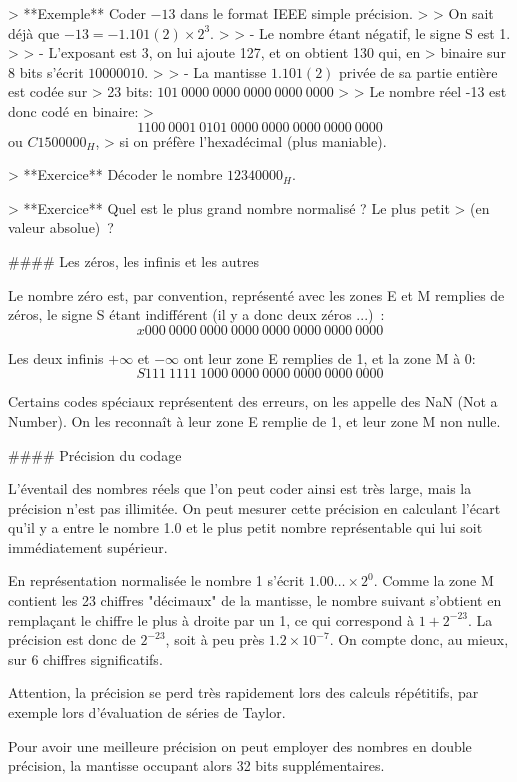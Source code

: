 > **Exemple** Coder $-13$ dans le format IEEE simple précision.
>
> On sait déjà que $-13 = -1.101 (2) \times 2^3$.
>
> -   Le nombre étant négatif, le signe S est 1.
>
> -   L'exposant est 3, on lui ajoute 127, et on obtient 130 qui, en
>     binaire sur 8 bits s'écrit $1000 0010$.
>
> -   La mantisse $1.101 (2)$ privée de sa partie entière est codée sur
>     23 bits: $101\ 0000\ 0000\ 0000\ 0000\ 0000$
>
> Le nombre réel -13 est donc codé en binaire:
> $$1100\ 0001\ 0101\ 0000\ 0000\ 0000\ 0000\ 0000$$ ou $C150 0000_H$,
> si on préfère l'hexadécimal (plus maniable).

> **Exercice** Décoder le nombre $1234 0000_H$.

> **Exercice** Quel est le plus grand nombre normalisé ? Le plus petit
> (en valeur absolue) ?

#### Les zéros, les infinis et les autres

Le nombre zéro est, par convention, représenté avec les zones E et M
remplies de zéros, le signe S étant indifférent (il y a donc deux zéros
...) : $$x000\ 0000\ 0000\ 0000\ 0000\ 0000\ 0000\ 0000$$

Les deux infinis $+\infty$ et $-\infty$ ont leur zone E remplies de 1,
et la zone M à 0: $$S111\ 1111\ 1000\ 0000\ 0000\ 0000\ 0000\ 0000$$

Certains codes spéciaux représentent des erreurs, on les appelle des NaN
(Not a Number). On les reconnaît à leur zone E remplie de 1, et leur
zone M non nulle.

#### Précision du codage

L'éventail des nombres réels que l'on peut coder ainsi est très large,
mais la précision n'est pas illimitée. On peut mesurer cette précision
en calculant l'écart qu'il y a entre le nombre 1.0 et le plus petit
nombre représentable qui lui soit immédiatement supérieur.

En représentation normalisée le nombre 1 s'écrit
$1.00\ldots \times 2^0$. Comme la zone M contient les 23 chiffres
"décimaux" de la mantisse, le nombre suivant s'obtient en remplaçant le
chiffre le plus à droite par un 1, ce qui correspond à $1+ 2^{-23}$. La
précision est donc de $2^{-23}$, soit à peu près $1.2 \times 10^{-7}$.
On compte donc, au mieux, sur 6 chiffres significatifs.

Attention, la précision se perd très rapidement lors des calculs
répétitifs, par exemple lors d'évaluation de séries de Taylor.

Pour avoir une meilleure précision on peut employer des nombres en
double précision, la mantisse occupant alors 32 bits supplémentaires.

